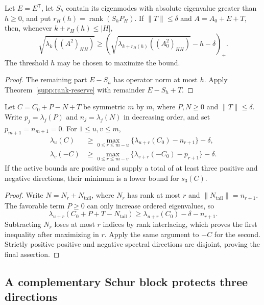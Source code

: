 \begin{corollary}
\label{supp:adaptive-rank}
Let $E=E^{\mathsf T}$, let $S_h$ contain its eigenmodes with
absolute eigenvalue greater than $h\ge0$, and put
$r_H(h)=\operatorname{rank}(S_hP_H)$.  If $\|T\|\le\delta$
and $A=A_0+E+T$, then, whenever $k+r_H(h)\le|H|$,
\[
 \sqrt{\lambda_k((A^2)_{HH})}\ge
 \left(\sqrt{\lambda_{k+r_H(h)}((A_0^2)_{HH})}
                                      -h-\delta\right)_+.
\]
The threshold $h$ may be chosen to maximize the bound.
\end{corollary}
\begin{proof}
The remaining part $E-S_h$ has operator norm at most $h$.
Apply Theorem~\ref{supp:rank-reserve} with remainder
$E-S_h+T$.
\end{proof}

\begin{proposition}
\label{supp:signed-reserve}
Let $C=C_0+P-N+T$ be symmetric $m$ by $m$, where $P,N\ge0$
and $\|T\|\le\delta$.  Write $p_j=\lambda_j(P)$ and
$n_j=\lambda_j(N)$ in decreasing order, and set
$p_{m+1}=n_{m+1}=0$.  For $1\le u,v\le m$,
\begin{align*}
 \lambda_u(C)&\ge
 \max_{0\le r\le m-u}
    \{\lambda_{u+r}(C_0)-n_{r+1}\}-\delta,\\
 \lambda_v(-C)&\ge
 \max_{0\le r\le m-v}
    \{\lambda_{v+r}(-C_0)-p_{r+1}\}-\delta.
\end{align*}
If the active bounds are positive and supply a total of at least
three positive and negative directions, their minimum is a lower
bound for $s_3(C)$.
\end{proposition}
\begin{proof}
Write $N=N_r+N_{\mathrm{tail}}$, where $N_r$ has rank at most $r$
and $\|N_{\mathrm{tail}}\|=n_{r+1}$.  The favorable term $P\ge0$
can only increase ordered eigenvalues, so
\[
 \lambda_{u+r}(C_0+P+T-N_{\mathrm{tail}})
 \ge\lambda_{u+r}(C_0)-\delta-n_{r+1}.
\]
Subtracting $N_r$ loses at most $r$ indices by rank interlacing,
which proves the first inequality after maximizing in $r$.
Apply the same argument to $-C$ for the second.  Strictly positive
positive and negative spectral directions are disjoint, proving
the final assertion.
\end{proof}

\subsection{A complementary Schur block protects three directions}


